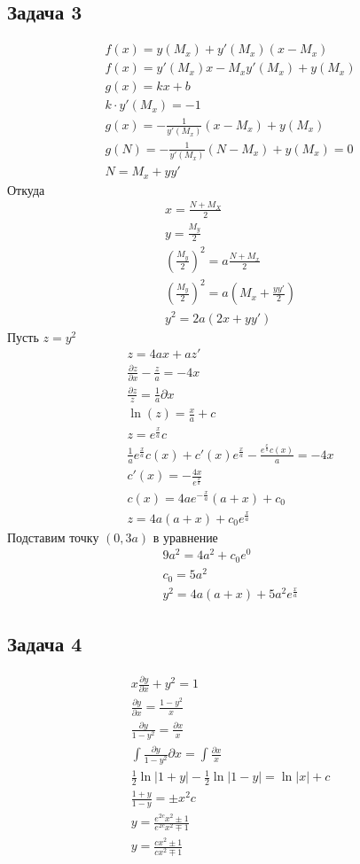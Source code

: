 \subsection*{Задача 3}
\begin{gather*}
	f(x) = y(M_x) + y'(M_x)(x - M_x)\\
	f(x) = y'(M_x) x - M_x y'(M_x) + y(M_x)\\
	g(x) = kx + b\\
	k \cdot y'(M_x) = -1\\
	g(x) = -\frac{1}{y'(M_x)}(x - M_x) + y(M_x)\\
	g(N) = -\frac{1}{y'(M_x)}(N - M_x) + y(M_x) = 0\\
	N = M_x + yy'
\end{gather*}
Откуда
\begin{gather*}
	x = \frac{N + M_X}{2}\\
	y = \frac{M_y}{2}\\
	(\frac{M_y}{2})^2 = a \frac{N + M_x}{2}\\
	(\frac{M_y}{2})^2 = a (M_x + \frac{yy'}{2})\\
	y^2 = 2a(2x + yy')
\end{gather*}
Пусть $z = y^2$
\begin{gather*}
	z = 4ax + az'\\
	\frac{\partial z}{\partial x} - \frac{z}{a} = -4x\\
	\frac{\partial z}{z} = \frac{1}{a} \partial x\\
	\ln(z) = \frac{x}{a} + c\\
	z = e^{\frac{x}{a}}c\\
	\frac{1}{a} e^{\frac{x}{a}} c(x) + c'(x) e^{\frac{x}{a}} - \frac{e^{\frac{x}{a}} c(x)}{a} = -4x\\
	c'(x) = -\frac{4x}{e^{\frac{x}{a}}}\\
	c(x) = 4ae^{-\frac{x}{a}} (a+x) + c_0\\
	z = 4a(a+x) + c_0 e^{\frac{x}{a}}
\end{gather*}
Подставим точку $(0,3a)$ в уравнение
\begin{gather*}
	9a^2 = 4a^2 + c_0 e^{0}\\
	c_0 = 5a^2\\
	y^2 = 4a(a+x) + 5a^2 e^{\frac{x}{a}}
\end{gather*}

\subsection*{Задача 4}
\begin{gather*}
	x \frac{\partial y}{\partial x} + y^2 = 1\\
	\frac{\partial y}{\partial x} = \frac{1-y^2}{x}\\
	\frac{\partial y}{1-y^2} = \frac{\partial x}{x}\\
	\int \frac{\partial y}{1-y^2} \partial x = \int \frac{\partial x}{x}\\
	\frac{1}{2} \ln|1+y| - \frac{1}{2} \ln|1-y| = \ln |x| + c\\
	\frac{1+y}{1-y} = \pm x^2 c\\
	y = \frac{e^{2c}x^{2} \pm 1}{e^{2c}x^{2} \mp 1}\\
	y = \frac{c x^{2} \pm 1}{c x^{2} \mp 1}
\end{gather*}

